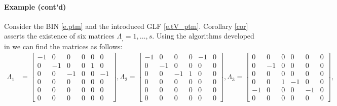 \documentclass[onefignum,onetabnum]{siamonline220329}
\newcommand\mybox{}
\def\ell{}%
\begin{document}
{ 
 \mybox{\paragraph{Example (cont'd)}  Consider the BIN \eqref{e.ptm} and the introduced GLF \eqref{e.tV_ptm}. Corollary \ref{cor} asserts the existence of six {matrices} $\Lambda_\ell,\ell=1,\dots,s$.  Using the algorithms developed in \cite{PWLRj,MA_LEARN} we can find the matrices as follows:
 {\tiny \begin{align*}\Lambda_1&=\left[\begin{array}{rrrrrrrr} -1 & 0 & 0 & 0 & 0 & 0\\ 0 & -1 & 0 & 0 & 1 & 0\\ 0 & 0 & -1 & 0 & 0 & -1\\ 0 & 0 & 0 & 0 & 0 & 0\\ 0 & 0 & 0 & 0 & 0 & 0\\ 0 & 0 & 0 & 0 & 0 & 0 \end{array}\right],\Lambda_2=\left[\begin{array}{rrrrrrrr} -1 & 0 & 0 & 0 & -1 & 0\\ 0 & -1 & 0 & 0 & 0 & 0\\ 0 & 0 & -1 & 1 & 0 & 0\\ 0 & 0 & 0 & 0 & 0 & 0\\ 0 & 0 & 0 & 0 & 0 & 0\\ 0 & 0 & 0 & 0 & 0 & 0 \end{array}\right], \Lambda_3=\left[\begin{array}{rrrrrrrr} 0 & 0 & 0 & 0 & 0 & 0\\ 0 & -1 & 0 & 0 & 0 & 0\\ 0 & 0 & 0 & 0 & 0 & 0\\ 0 & 0 & 1 & -1 & 0 & 0\\ -1 & 0 & 0 & 0 & -1 & 0\\ 0 & 0 & 0 & 0 & 0 & 0 \end{array}\right],\\

\end{align*}}}}
\end{document}
